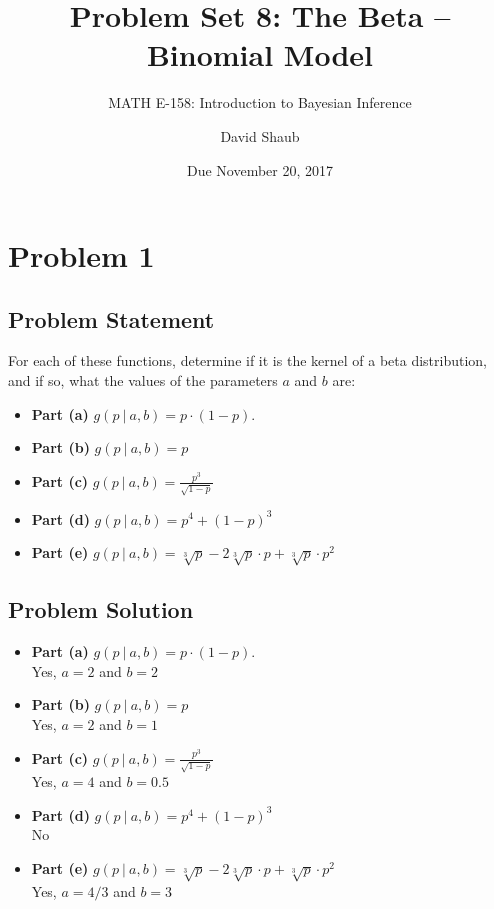 \documentclass[12pt]{article}
\title{Problem Set 8: The Beta -- Binomial Model}
\author{MATH E-158: Introduction to Bayesian Inference}
\author{David Shaub}
\date{Due November 20, 2017}
\theoremstyle{definition}
\begin{document}
	
	\maketitle


\section*{Problem 1}


\subsection*{Problem Statement}

\bigskip
For each of these functions, determine if it is the kernel of a beta distribution, and if so, what the values of the parameters $a$ and $b$ are:
\begin{itemize}
	\item {\bf Part (a)} $g(p\ |\ a,b) = p \cdot (1 - p)$.
	\item {\bf Part (b)} $g(p\ |\ a,b) = p$
	\item {\bf Part (c)} $g(p\ |\ a,b) = \displaystyle \frac{ p^3}{\sqrt{1 - p} }$
	\item {\bf Part (d)} $g(p\ |\ a,b) = p^4 + (1 - p)^3$
	\item {\bf Part (e)} $g(p\ |\ a,b) = \sqrt[3]{p} - 2 \sqrt[3]{p} \cdot p + \sqrt[3]{p} \cdot p^2 $
\end{itemize}



\subsection*{Problem Solution}
\begin{itemize}
	\item {\bf Part (a)} $g(p\ |\ a,b) = p \cdot (1 - p)$.\\
	Yes, $a=2$ and $b=2$
	\item {\bf Part (b)} $g(p\ |\ a,b) = p$\\
	Yes, $a=2$ and $b=1$
	\item {\bf Part (c)} $g(p\ |\ a,b) = \displaystyle \frac{ p^3}{\sqrt{1 - p} }$\\
	Yes, $a=4$ and $b=0.5$
	\item {\bf Part (d)} $g(p\ |\ a,b) = p^4 + (1 - p)^3$\\
	No
	\item {\bf Part (e)} $g(p\ |\ a,b) = \sqrt[3]{p} - 2 \sqrt[3]{p} \cdot p + \sqrt[3]{p} \cdot p^2 $\\
	Yes, $a=4/3$ and $b=3$
\end{itemize}
\end{document}
